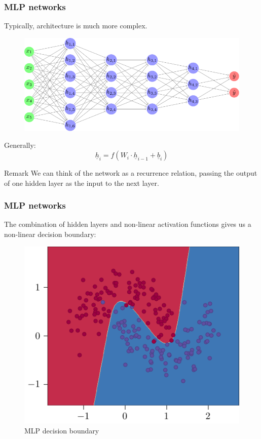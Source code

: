\documentclass{beamer}
\begin{document}
\begin{frame}
    \frametitle{MLP networks}
    Typically, architecture is much more complex.
    \begin{figure}
        \centering
        \includegraphics[height=0.4\textheight]{./figures/mlp/main.pdf}
    \end{figure} \pause
    Generally:
    \[\underline{h}_i = f(W_i \cdot \underline{h}_{i - 1} + \underline{b}_i)\]
    \begin{block}{Remark}
        We can think of the network as a recurrence relation, passing the output of one hidden layer as the input to the next layer.
    \end{block}
\end{frame}

\begin{frame}
    \frametitle{MLP networks}
    The combination of \alert{hidden layers} and \alert{non-linear activation functions} gives us a \alert{non-linear decision boundary}:
    \begin{figure}
        \centering
        \includegraphics[height=0.6\textheight]{figures/non-linear-boundary/main.pdf}
        \caption{MLP decision boundary}
    \end{figure}
\end{frame}
\end{document}
